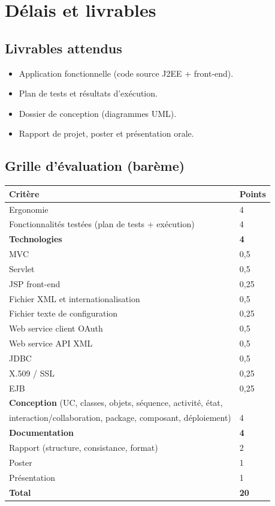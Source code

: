 \chapter{Délais et livrables}

\section{Livrables attendus}
\begin{itemize}
  \item Application fonctionnelle (code source J2EE + front-end).
  \item Plan de tests et résultats d'exécution.
  \item Dossier de conception (diagrammes UML).
  \item Rapport de projet, poster et présentation orale.
\end{itemize}

\section{Grille d'évaluation (barème)}
\begin{longtable}{p{9.5cm} C{2.5cm}}
\toprule
\textbf{Critère} & \textbf{Points} \\
\midrule
\endhead
Ergonomie & 4 \\
Fonctionnalités testées (plan de tests + exécution) & 4 \\
\textbf{Technologies} & \textbf{4} \\
\quad MVC & 0,5 \\
\quad Servlet & 0,5 \\
\quad JSP front-end & 0,25 \\
\quad Fichier XML et internationalisation & 0,5 \\
\quad Fichier texte de configuration & 0,25 \\
\quad Web service client OAuth & 0,5 \\
\quad Web service API XML & 0,5 \\
\quad JDBC & 0,5 \\
\quad X.509 / SSL & 0,25 \\
\quad EJB & 0,25 \\
\textbf{Conception} (UC, classes, objets, séquence, activité, état, & \\
\quad interaction/collaboration, package, composant, déploiement) & 4 \\
\textbf{Documentation} & \textbf{4} \\
\quad Rapport (structure, consistance, format) & 2 \\
\quad Poster & 1 \\
\quad Présentation & 1 \\
\midrule
\textbf{Total} & \textbf{20} \\
\bottomrule
\end{longtable}

